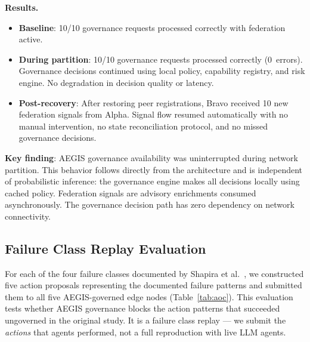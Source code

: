 \documentclass[journal]{IEEEtran}
\begin{document}
\textbf{Results.}

\begin{itemize}
\item \textbf{Baseline}: 10/10 governance requests processed correctly with federation active.
\item \textbf{During partition}: 10/10 governance requests processed correctly (0~errors). Governance decisions continued using local policy, capability registry, and risk engine. No degradation in decision quality or latency.
\item \textbf{Post-recovery}: After restoring peer registrations, Bravo received 10 new federation signals from Alpha. Signal flow resumed automatically with no manual intervention, no state reconciliation protocol, and no missed governance decisions.
\end{itemize}

\textbf{Key finding}: AEGIS governance availability was uninterrupted during network partition. This behavior follows directly from the architecture and is independent of probabilistic inference: the governance engine makes all decisions locally using cached policy. Federation signals are advisory enrichments consumed asynchronously. The governance decision path has zero dependency on network connectivity.

\subsection{Failure Class Replay Evaluation}

For each of the four failure classes documented by Shapira et al.~\cite{shapira2026}, we constructed five action proposals representing the documented failure patterns and submitted them to all five AEGIS-governed edge nodes (Table~\ref{tab:aoc}). This evaluation tests whether AEGIS governance blocks the action patterns that succeeded ungoverned in the original study. It is a failure class replay --- we submit the \textit{actions} that agents performed, not a full reproduction with live LLM agents.
\end{document}
